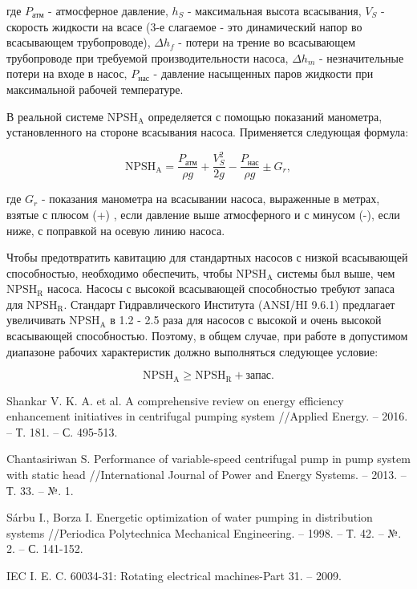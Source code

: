 \documentclass[a4paper, 12pt]{article}
\begin{document}
\noindent где $P_{\text{атм}}$ - атмосферное давление, $h_S$ - максимальная высота всасывания, $V_S$ - скорость жидкости на всасе (3-е слагаемое - это динамический напор во всасывающем трубопроводе), $\Delta h_f$ - потери на трение во всасывающем трубопроводе при требуемой производительности насоса, $\Delta h_m$ - незначительные потери на входе в насос, $P_{\text{нас}}$ - давление насыщенных паров жидкости при максимальной рабочей температуре.

В реальной системе $\text{NPSH}{_\text{A}}$ определяется с помощью показаний манометра, установленного на стороне всасывания насоса. Применяется следующая формула:

\begin{equation}
	\text{NPSH}{_\text{A}} = \frac{P_{\text{атм}}}{\rho g} + \frac{V_S^2}{2g} - \frac{P_{\text{нас}}}{\rho g} \pm G_r,
\end{equation}

\noindent где $G_r$ - показания манометра на всасывании насоса, выраженные в метрах, взятые с плюсом (+) , если давление выше атмосферного и с минусом (-), если ниже, с поправкой на осевую линию насоса.


Чтобы предотвратить кавитацию для стандартных насосов с низкой всасывающей способностью, необходимо обеспечить, чтобы $\text{NPSH}{_\text{A}}$ системы был выше, чем $\text{NPSH}{_\text{R}}$ насоса. Насосы с высокой всасывающей способностью требуют запаса для $\text{NPSH}{_\text{R}}$. Стандарт Гидравлического Института (ANSI/HI 9.6.1) предлагает увеличивать $\text{NPSH}{_\text{A}}$ в 1.2 - 2.5 раза для насосов с высокой и очень высокой всасывающей способностью. Поэтому, в общем случае, при работе в допустимом диапазоне рабочих характеристик должно выполняться следующее условие:

\begin{equation}
	\text{NPSH}{_\text{A}} \ge \text{NPSH}{_\text{R}} + \text{запас}.
\end{equation}


\noindent 



    
\begin{thebibliography}{00} %

	Shankar V. K. A. et al. A comprehensive review on energy efficiency enhancement initiatives in centrifugal pumping system //Applied Energy. – 2016. – Т. 181. – С. 495-513.
	
	Chantasiriwan S. Performance of variable-speed centrifugal pump in pump system with static head //International Journal of Power and Energy Systems. – 2013. – Т. 33. – №. 1.
	
	Sárbu I., Borza I. Energetic optimization of water pumping in distribution systems //Periodica Polytechnica Mechanical Engineering. – 1998. – Т. 42. – №. 2. – С. 141-152.
	
	IEC I. E. C. 60034-31: Rotating electrical machines-Part 31. – 2009.
	
\end{thebibliography}
    
    
    
    
    
\end{document}
